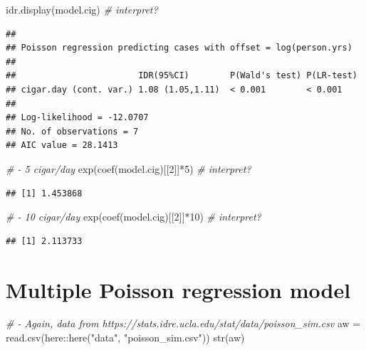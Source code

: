 \documentclass[
]{book}
\makeatletter
\newenvironment{Shaded}{\begin{snugshade}}{\end{snugshade}}
\newcommand{\CommentTok}[1]{\textcolor[rgb]{0.37,0.37,0.37}{\textit{#1}}}
\newcommand{\DecValTok}[1]{\textcolor[rgb]{0.06,0.06,0.06}{#1}}
\newcommand{\FunctionTok}[1]{\textcolor[rgb]{0,0,0}{#1}}
\newcommand{\NormalTok}[1]{#1}
\newcommand{\OtherTok}[1]{\textcolor[rgb]{0.37,0.37,0.37}{#1}}
\newcommand{\SpecialCharTok}[1]{\textcolor[rgb]{0,0,0}{#1}}
\newcommand{\StringTok}[1]{\textcolor[rgb]{0.5,0.5,0.5}{#1}}
\newenvironment{kframe}{%
\medskip{}
\setlength{\fboxsep}{.8em}
 \def\at@end@of@kframe{}%
 \ifinner\ifhmode%
  \def\at@end@of@kframe{\end{minipage}}%
  \begin{minipage}{\columnwidth}%
 \fi\fi%
 \def\FrameCommand##1{\hskip\@totalleftmargin \hskip-\fboxsep
 \colorbox{shadecolor}{##1}\hskip-\fboxsep
     \hskip-\linewidth \hskip-\@totalleftmargin \hskip\columnwidth}%
 \MakeFramed {\advance\hsize-\width
   \@totalleftmargin\z@ \linewidth\hsize
   \@setminipage}}%
 {\par\unskip\endMakeFramed%
 \at@end@of@kframe}
\renewenvironment{Shaded}{\begin{kframe}}{\end{kframe}}
\makeatother
\begin{document}
\begin{Shaded}
\begin{Highlighting}[]
\FunctionTok{idr.display}\NormalTok{(model.cig)  }\CommentTok{\# interpret?}
\end{Highlighting}
\end{Shaded}

\begin{verbatim}
## 
## Poisson regression predicting cases with offset = log(person.yrs) 
##  
##                        IDR(95%CI)        P(Wald's test) P(LR-test)
## cigar.day (cont. var.) 1.08 (1.05,1.11)  < 0.001        < 0.001   
##                                                                   
## Log-likelihood = -12.0707
## No. of observations = 7
## AIC value = 28.1413
\end{verbatim}

\begin{Shaded}
\begin{Highlighting}[]
\CommentTok{\# {-} 5 cigar/day}
\FunctionTok{exp}\NormalTok{(}\FunctionTok{coef}\NormalTok{(model.cig)[[}\DecValTok{2}\NormalTok{]]}\SpecialCharTok{*}\DecValTok{5}\NormalTok{)  }\CommentTok{\# interpret?}
\end{Highlighting}
\end{Shaded}

\begin{verbatim}
## [1] 1.453868
\end{verbatim}

\begin{Shaded}
\begin{Highlighting}[]
\CommentTok{\# {-} 10 cigar/day}
\FunctionTok{exp}\NormalTok{(}\FunctionTok{coef}\NormalTok{(model.cig)[[}\DecValTok{2}\NormalTok{]]}\SpecialCharTok{*}\DecValTok{10}\NormalTok{)  }\CommentTok{\# interpret?}
\end{Highlighting}
\end{Shaded}

\begin{verbatim}
## [1] 2.113733
\end{verbatim}

\hypertarget{multiple-poisson-regression-model}{%
\section{Multiple Poisson regression model}\label{multiple-poisson-regression-model}}

\begin{Shaded}
\begin{Highlighting}[]
\CommentTok{\# {-} Again, data from https://stats.idre.ucla.edu/stat/data/poisson\_sim.csv}
\NormalTok{aw }\OtherTok{=} \FunctionTok{read.csv}\NormalTok{(here}\SpecialCharTok{::}\FunctionTok{here}\NormalTok{(}\StringTok{"data"}\NormalTok{, }\StringTok{"poisson\_sim.csv"}\NormalTok{))}
\FunctionTok{str}\NormalTok{(aw)}
\end{Highlighting}
\end{Shaded}
\end{document}
